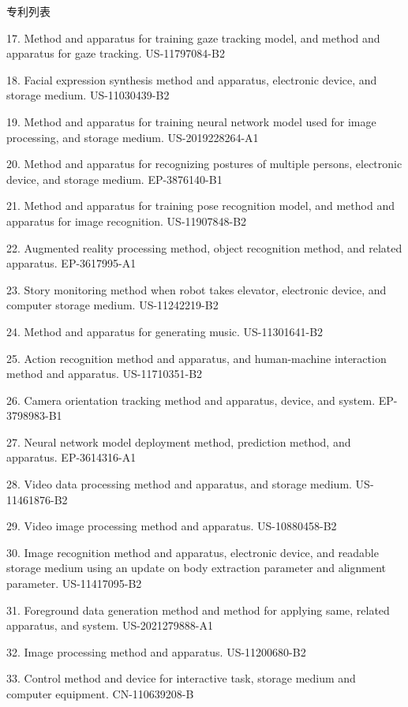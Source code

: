 \documentclass[UTF8]{cv_professional-cn} %
\makeatletter
\newlength{\bibhang}
\newlength{\bibsep}
 {\@listi \global\bibsep\itemsep \global\advance\bibsep by\parsep}
\newenvironment{bibsection}%
        {\vspace{\itemsep}\begin{list}{}{%
       \setlength{\leftmargin}{\bibhang}%
       \setlength{\itemsep}{\bibsep}%
       \setlength{\parsep}{\z@}%
        \setlength{\partopsep}{0pt}%
        \setlength{\topsep}{0pt}}}
        {\end{list}\vspace{\itemsep}}
\makeatother
\begin{document}
\begin{rSection}{专利列表}
\begin{bibsection}
  \item[17.] Method and apparatus for training gaze tracking model, and method and apparatus for gaze tracking. US-11797084-B2
  \item[18.] Facial expression synthesis method and apparatus, electronic device, and storage medium. US-11030439-B2
  \item[19.] Method and apparatus for training neural network model used for image processing, and storage medium. US-2019228264-A1
  \item[20.] Method and apparatus for recognizing postures of multiple persons, electronic device, and storage medium. EP-3876140-B1
  \item[21.] Method and apparatus for training pose recognition model, and method and apparatus for image recognition. US-11907848-B2
  \item[22.] Augmented reality processing method, object recognition method, and related apparatus. EP-3617995-A1
  \item[23.] Story monitoring method when robot takes elevator, electronic device, and computer storage medium. US-11242219-B2
  \item[24.] Method and apparatus for generating music. US-11301641-B2
  \item[25.] Action recognition method and apparatus, and human-machine interaction method and apparatus. US-11710351-B2
  \item[26.] Camera orientation tracking method and apparatus, device, and system. EP-3798983-B1
  \item[27.] Neural network model deployment method, prediction method, and apparatus. EP-3614316-A1
  \item[28.] Video data processing method and apparatus, and storage medium. US-11461876-B2
  \item[29.] Video image processing method and apparatus. US-10880458-B2
  \item[30.] Image recognition method and apparatus, electronic device, and readable storage medium using an update on body extraction parameter and alignment parameter. US-11417095-B2
  \item[31.] Foreground data generation method and method for applying same, related apparatus, and system. US-2021279888-A1
  \item[32.] Image processing method and apparatus. US-11200680-B2
  \item[33.] Control method and device for interactive task, storage medium and computer equipment. CN-110639208-B

\end{bibsection}
\end{rSection}
\end{document}

